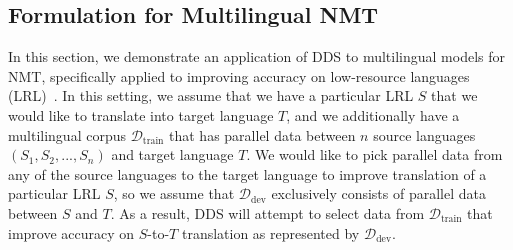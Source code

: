 \subsection{\label{sec:nmt_method}Formulation for Multilingual NMT}

In this section, we demonstrate an application of DDS to multilingual models for NMT, specifically applied to improving accuracy on low-resource languages (LRL)~\citep{nmt_transfer,rapid_adapt_nmt,johnson_nmt}.
In this setting, we assume that we have a particular LRL $S$ that we would like to translate into target language $T$, and we additionally have a multilingual corpus $\mathcal{D}_{\text{train}}$ that has parallel data between $n$ source languages $(S_1, S_2, ..., S_n)$ and target language $T$.
We would like to pick parallel data from any of the source languages to the target language to improve translation of a particular LRL $S$, so we assume that $\mathcal{D}_{\text{dev}}$ exclusively consists of parallel data between $S$ and $T$.
As a result, DDS will attempt to select data from $\mathcal{D}_{\text{train}}$ that improve accuracy on $S$-to-$T$ translation as represented by $\mathcal{D}_{\text{dev}}$.
    \vspace{-0.2cm}
